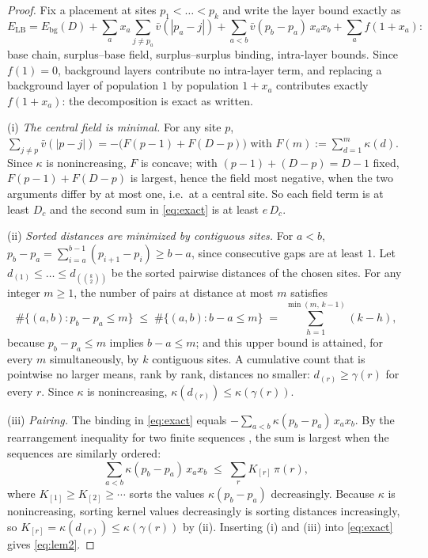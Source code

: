 \documentclass[11pt]{article}
\theoremstyle{remark}
\newcommand{\LB}{\mathrm{LB}}
\newcommand{\bg}{\mathrm{bg}}
\begin{document}
\begin{proof}
Fix a placement at sites $p_1<\dots<p_k$ and write the layer bound exactly as
\begin{equation}\label{eq:exact}
E_\LB = E_\bg(D) + \sum_a x_a \sum_{j\ne p_a} \bar v(|p_a-j|) + \sum_{a<b} \bar v(p_b-p_a)\, x_a x_b + \sum_a f(1+x_a):
\end{equation}
base chain, surplus--base field, surplus--surplus binding, intra-layer bounds. Since $f(1)=0$, background layers contribute no intra-layer term, and replacing a background layer of population $1$ by population $1+x_a$ contributes exactly $f(1+x_a)$: the decomposition is exact as written.

(i) \emph{The central field is minimal.} For any site $p$, $\sum_{j\ne p}\bar v(|p-j|)=-\bigl(F(p-1)+F(D-p)\bigr)$ with $F(m):=\sum_{d=1}^m \kappa(d)$. Since $\kappa$ is nonincreasing, $F$ is concave; with $(p-1)+(D-p)=D-1$ fixed, $F(p-1)+F(D-p)$ is largest, hence the field most negative, when the two arguments differ by at most one, i.e.\ at a central site. So each field term is at least $D_c$ and the second sum in \eqref{eq:exact} is at least $e\,D_c$.

(ii) \emph{Sorted distances are minimized by contiguous sites.} For $a<b$, $p_b-p_a=\sum_{i=a}^{b-1}(p_{i+1}-p_i)\ge b-a$, since consecutive gaps are at least $1$. Let $d_{(1)}\le\dots\le d_{(\binom k2)}$ be the sorted pairwise distances of the chosen sites. For any integer $m\ge1$, the number of pairs at distance at most $m$ satisfies
\[
\#\bigl\{(a,b): p_b-p_a\le m\bigr\} \;\le\; \#\bigl\{(a,b): b-a\le m\bigr\} \;=\; \sum_{h=1}^{\min(m,\,k-1)} (k-h),
\]
because $p_b-p_a\le m$ implies $b-a\le m$; and this upper bound is attained, for every $m$ simultaneously, by $k$ contiguous sites. A cumulative count that is pointwise no larger means, rank by rank, distances no smaller: $d_{(r)}\ge\gamma(r)$ for every $r$. Since $\kappa$ is nonincreasing, $\kappa(d_{(r)})\le\kappa(\gamma(r))$.

(iii) \emph{Pairing.} The binding in \eqref{eq:exact} equals $-\sum_{a<b}\kappa(p_b-p_a)\,x_a x_b$. By the rearrangement inequality for two finite sequences \cite[Thm.\ 368]{hlp}, the sum is largest when the sequences are similarly ordered:
\[
\sum_{a<b}\kappa(p_b-p_a)\,x_a x_b \;\le\; \sum_r K_{[r]}\,\pi(r),
\]
where $K_{[1]}\ge K_{[2]}\ge\cdots$ sorts the values $\kappa(p_b-p_a)$ decreasingly. Because $\kappa$ is nonincreasing, sorting kernel values decreasingly is sorting distances increasingly, so $K_{[r]}=\kappa(d_{(r)})\le\kappa(\gamma(r))$ by (ii). Inserting (i) and (iii) into \eqref{eq:exact} gives \eqref{eq:lem2}.
\end{proof}
\end{document}
